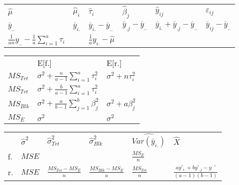 \documentclass[10pt,portrait]{article}
\begin{document}
\begin{multicols}{2}
\begin{tabular}{l|l|l|l|l|l}
$\hat\mu$&$\hat\mu_i$&$\hat\tau_i$&$\hat\beta_j$&$\hat y_{ij}$&$\varepsilon_{ij}$\\
$\bar y_{..}$&$\bar y_{i.}$&$\bar y_{i.}-\bar y_{..}$&$\bar y_{.j}-\bar y_{..}$&$\bar y_{i.}+\bar y_{.j}-\bar y_{..}$&$\bar y_{ij}-\bar y_{..}$\\
$\frac1{an}y_{..}-\frac1{a}\sum_{i=1}^a\hat\tau_i$& & $\frac1{a}y_{i.}-\hat\mu$\\
\hline
\end{tabular}

\begin{tabular}{l|l|l}
     &E[f.]&E[r.]\\
$MS_{Trt}$ & $\sigma^2+\frac{n}{a-1}\sum_{i=1}^a\tau_i^2$&$\sigma^2+n\tau_i^2$\\
$MS_{Trt}$ & $\sigma^2+\frac{b}{a-1}\sum_{i=1}^a\tau_i^2$&\\
$MS_{Blk}$ &$\sigma^2+\frac{a}{b-1}\sum_{j=1}^b\beta_j^2$&$\sigma^2+a\beta_j^2$\\
$MS_{E}$   &$\sigma^2$&$\sigma^2$\\
\hline
\end{tabular}

\begin{tabular}{l|l|l|l|l|l}
&$\hat\sigma^2$&$\hat\sigma_{Trt}^2$&$\hat\sigma_{Blk}^2$&$\widehat{Var(\bar y_{i.})}$&$\hat{X}$\\
f.&$MSE$& & &$\frac{MS_{E}}{n}$&\\
r.&$MSE$&$\frac{MS_{Trt}-MS_{E}}{n}$&$\frac{MS_{Blk}-MS_{E}}{a}$&$\frac{MS_{Trt}}{n}$&$\frac{ay'_{i.}+by'_{.j}-y_{..}'}{(a-1)(b-1)}$\\
\end{tabular}



\end{multicols}
\end{document}
